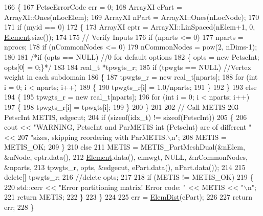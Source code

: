 \begin{DoxyCode}
166 \{
167   PetscErrorCode err = 0;
168   ArrayXI ePart = ArrayXI::Ones(nLocElem);
169   ArrayXI nPart = ArrayXI::Ones(nLocNode);
170 
171   \textcolor{keywordflow}{if} (myid == 0)
172   \{
173     ArrayXI eptr = ArrayXI::LinSpaced(nElem+1, 0, \mbox{\hyperlink{class_element}{Element}}.size());
174 
175     \textcolor{comment}{// Verify Inputs}
176     \textcolor{keywordflow}{if} (nparts <= 0)
177       nparts = nprocs;
178     \textcolor{keywordflow}{if} (nCommonNodes <= 0)
179       nCommonNodes = pow(2, nDims-1);
180 
181     \textcolor{comment}{/*if (opts == NULL)                         //0 for default options}
182 \textcolor{comment}{    \{ opts = new PetscInt; opts[0] = 0;\}*/}
183 
184     real\_t *tpwgts\_r;
185     \textcolor{keywordflow}{if} (tpwgts == NULL)                \textcolor{comment}{//Vertex weight in each subdomain}
186     \{
187       tpwgts\_r = \textcolor{keyword}{new} real\_t[nparts];
188       \textcolor{keywordflow}{for} (\textcolor{keywordtype}{int} i = 0; i < nparts; i++)
189       \{
190         tpwgts\_r[i] = 1.0/nparts;
191       \}
192     \}
193     \textcolor{keywordflow}{else}
194     \{
195       tpwgts\_r = \textcolor{keyword}{new} real\_t[nparts];
196       \textcolor{keywordflow}{for} (\textcolor{keywordtype}{int} i = 0; i < nparts; i++)
197       \{
198         tpwgts\_r[i] = tpwgts[i];
199       \}
200     \}
201 
202     \textcolor{comment}{// Call METIS}
203     PetscInt METIS, edgecut;
204     \textcolor{keywordflow}{if} (\textcolor{keyword}{sizeof}(idx\_t) != \textcolor{keyword}{sizeof}(PetscInt))
205     \{
206       cout << \textcolor{stringliteral}{"WARNING, PetscInt and ParMETIS int (PetscInt) are of different "} <<
207               \textcolor{stringliteral}{"sizes, skipping reordering with ParMETIS.\(\backslash\)n"};
208       METIS = METIS\_OK;
209     \}
210     \textcolor{keywordflow}{else}
211       METIS = METIS\_PartMeshDual(&nElem, &nNode, eptr.data(),
212               \mbox{\hyperlink{class_element}{Element}}.data(), elmwgt, NULL, &nCommonNodes, &nparts,
213           tpwgts\_r, opts, &edgecut, ePart.data(), nPart.data());
214 
215     \textcolor{keyword}{delete}[] tpwgts\_r;
216     \textcolor{comment}{//delete opts;}
217 
218     \textcolor{keywordflow}{if} (METIS != METIS\_OK)
219     \{
220       std::cerr << \textcolor{stringliteral}{"Error partitioning matrix! Error code: "} << METIS << \textcolor{stringliteral}{"\(\backslash\)n"};
221       \textcolor{keywordflow}{return} METIS;
222     \}
223   \}
224 
225   err = \mbox{\hyperlink{class_mesh_a1c915802d56c4ded24e460e83cfb5399}{ElemDist}}(ePart);
226 
227   \textcolor{keywordflow}{return} err;
228 \}
\end{DoxyCode}
\mbox{\label{class_mesh_ab9c61b0cf7cbcb8738d0e904fe532e91}} 
